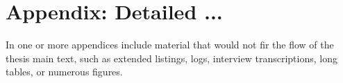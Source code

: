\chapter{Appendix: Detailed ...}
\label{ch:appendix}

In one or more appendices include material that would not fir
the flow of the thesis main text, such as
extended listings,
logs,
interview transcriptions,
long tables, or
numerous figures.
